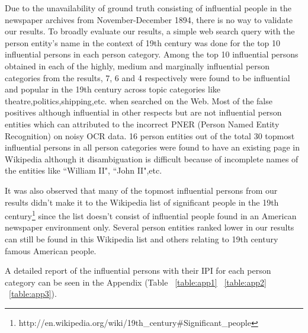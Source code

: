 Due to the unavailability of ground truth consisting of influential people in the newspaper archives from November-December 1894, there is no way to validate our results. 
To broadly evaluate our results, a simple web search query with the person entity's name in the context of 19th century was done for the top 10 influential persons in each person category.
 Among the top 10 influential persons obtained in each of the highly, medium and marginally influential person categories from the results,  7, 6 and 4 respectively were found to be influential and popular in the 19th century across topic categories like theatre,politics,shipping,etc. when searched on the Web. Most of the false positives although influential in other respects but are not  influential person entities which can attributed to the incorrect PNER (Person Named Entity Recognition) on noisy OCR data.
16 person entities out of the total 30 topmost influential persons in all person categories were found to have an existing page in Wikipedia although it disambiguation is difficult because of incomplete names of the entities like ``William II", ``John II",etc.
   
It was also observed that many of the topmost influential persons from our results didn't make it to the Wikipedia list of significant people in the 19th century\footnote{http://en.wikipedia.org/wiki/19th\_century\#Significant\_people} since the list doesn't consist of influential people found in an American newspaper environment only. Several person entities ranked lower in our results can still be found in this Wikipedia list and others relating to 19th century famous American people.

 A detailed report of the influential persons with their IPI for each person category can be seen in the Appendix (Table ~\ref{table:app1} ~\ref{table:app2} ~\ref{table:app3}).



